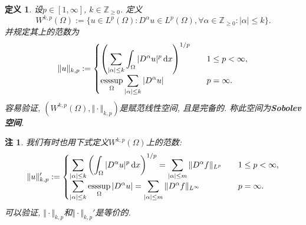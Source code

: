 \documentclass[12pt,a4paper]{article}
\newtheorem{definition}[theorem]{定义}
\newtheorem{remark}[theorem]{注}
\begin{document}
\begin{definition}
    设$p \in [1, \infty]$, $k \in \mathbb{Z}_{\geq 0}$. 定义 
    \begin{equation*}
        \boxed{W^{k, p}(\Omega) := \{u \in L^p(\Omega)\colon D^{\alpha}u \in L^p(\Omega), \forall \alpha\in \mathbb{Z}_{\geq 0}\colon |\alpha| \leq k\}.}
    \end{equation*}
    并规定其上的范数为 
    \begin{equation*}
        \Vert u \Vert_{k, p} := 
        \begin{cases}
            \displaystyle\left(\sum_{|\alpha| \leq k}\int_{\Omega}|D^{\alpha}u|^p \,{\rm d}x\right)^{1/p} \quad &1 \leq p < \infty, \\ 
            \displaystyle\mathop{{\rm esssup}}\limits_{\Omega}\sum_{|\alpha| \leq k}|D^{\alpha}u| \quad &p = \infty.
        \end{cases}
    \end{equation*}
    容易验证, $(W^{k, p}(\Omega), \Vert \cdot \Vert_{k, p})$是赋范线性空间, 且是完备的.
    称此空间为\textbf{Sobolev空间}.
\end{definition}

\begin{remark}
    我们有时也用下式定义$W^{k, p}(\Omega)$上的范数:
    \begin{equation*}
        \Vert u \Vert_{k, p}' := 
        \begin{cases}
            \displaystyle\sum_{|\alpha| \leq k}\left(\int_{\Omega}|D^{\alpha}u|^p \,{\rm d}x\right)^{1/p} = \sum_{|\alpha| \leq m}\Vert D^{\alpha}f\Vert_{L^p} \quad &1 \leq p < \infty, \\ 
            \displaystyle\sum_{|\alpha| \leq k}\mathop{{\rm esssup}}\limits_{\Omega}|D^{\alpha}u| = \sum_{|\alpha| \leq m}\Vert D^{\alpha}f\Vert_{L^{\infty}} \quad &p = \infty.
        \end{cases}
    \end{equation*}
    可以验证, $\Vert \cdot \Vert_{k, p}$和$\Vert \cdot \Vert_{k, p}'$是等价的.
\end{remark}
\end{document}
